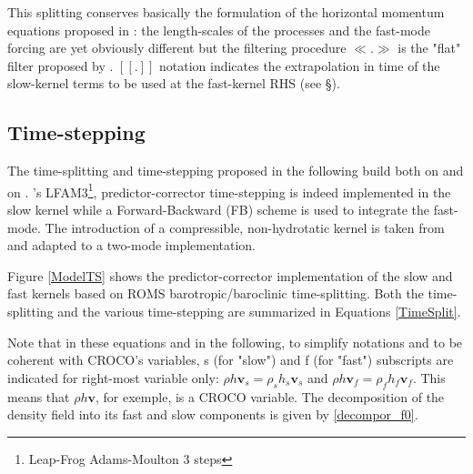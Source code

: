 This splitting conserves basically the formulation of the horizontal momentum equations proposed in \cite{shchepetkin_regional_2005}: the length-scales of the processes and the fast-mode forcing are yet obviously different but the filtering procedure $\ll.\gg$ is the "flat" filter proposed by \cite{shchepetkin_regional_2005}. $[[.]]$ notation indicates the extrapolation in time of the slow-kernel terms to be used at the fast-kernel RHS (see \S {}).\\


\subsection{Time-stepping}
The time-splitting and time-stepping proposed in the following build both on \cite{shchepetkin_regional_2005} and on \cite{Auclair2018}.   \cite{shchepetkin_regional_2005}'s LFAM3\footnote{Leap-Frog Adams-Moulton 3 steps}, predictor-corrector time-stepping is indeed implemented in the slow kernel while a Forward-Backward (FB) scheme is used to integrate the fast-mode. The introduction of a compressible, non-hydrotatic kernel is taken from \cite{Auclair2018} and adapted to a two-mode implementation.

Figure \ref{ModelTS} shows the predictor-corrector implementation of the slow and fast kernels based on ROMS barotropic/baroclinic time-splitting. Both the time-splitting and the various time-stepping are summarized in Equations \ref{TimeSplit}.

Note that in these equations and in the following, to simplify notations and to be coherent with CROCO's variables, s (for "slow") and f (for "fast") subscripts are indicated for right-most variable only: $\rho h \mathbf{v}_s=\rho_s h_s \mathbf{v}_s$ and $\rho h \mathbf{v}_f=\rho_f h_f \mathbf{v}_f$. This means that $\rho h \mathbf{v}$, for exemple, is a CROCO variable. The decomposition of the density field into its fast and slow components is given by  \ref{decompor_f0}.

